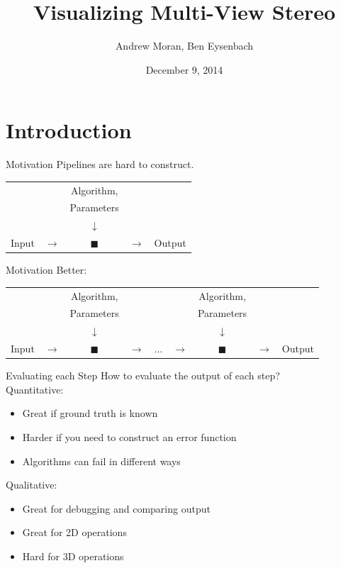 \documentclass{beamer}
\begin{document}
\title{Visualizing Multi-View Stereo}
\author{Andrew Moran, Ben Eysenbach}
\date{December 9, 2014}

\frame{\titlepage}

\section{Introduction}

\begin{frame}{Motivation}
  Pipelines are hard to construct.
  
  \begin{center}
  \begin{tabular}{ccccc}
    & & Algorithm, & & \\ 
    & & Parameters & & \\ 
    & & $\downarrow$ & &  \\ 
    Input & $\rightarrow$ & $\blacksquare$ & $\rightarrow$ & Output \\ 
  \end{tabular} 
  \end{center}
  
\end{frame}

\begin{frame}{Motivation}
  Better:
  
  \begin{center}
    \begin{tabular}{ccccccccc}
      & & Algorithm, & & & & Algorithm, & & \\ 
      & & Parameters & & & & Parameters & & \\ 
      & & $\downarrow$ & & & & $\downarrow$ & & \\ 
      Input & $\rightarrow$ & $\blacksquare$ & $\rightarrow$ & ... & $\rightarrow$ & $\blacksquare$ & $\rightarrow$ & Output \\ 
    \end{tabular} 
  \end{center}

\end{frame}

\begin{frame}{Evaluating each Step}
  How to evaluate the output of each step?\\
  
  Quantitative:
  \begin{itemize}
    \item Great if ground truth is known
    \item Harder if you need to construct an error function
    \item Algorithms can fail in different ways
  \end{itemize}
  
  Qualitative:
  \begin{itemize}
    \item Great for debugging and comparing output
    \item Great for 2D operations
    \item Hard for 3D operations
  \end{itemize}
  
\end{frame}  
  
\end{document}
